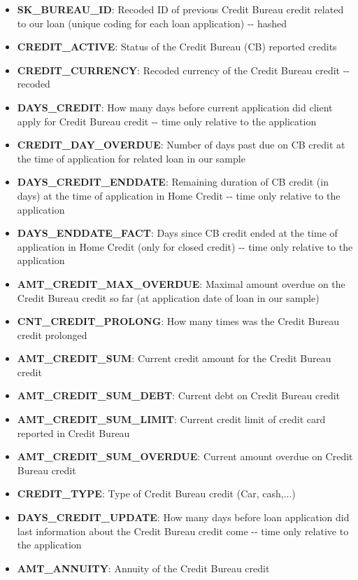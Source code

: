 \documentclass[11pt]{article}
\providecommand{\tightlist}{%
      \setlength{\itemsep}{0pt}\setlength{\parskip}{0pt}}
\begin{document}
\begin{itemize}
\tightlist
\item
  \textbf{SK\_BUREAU\_ID}: Recoded ID of previous Credit Bureau credit
  related to our loan (unique coding for each loan application) -\/-
  hashed
\item
  \textbf{CREDIT\_ACTIVE}: Status of the Credit Bureau (CB) reported
  credits\\
\item
  \textbf{CREDIT\_CURRENCY}: Recoded currency of the Credit Bureau
  credit -\/- recoded
\item
  \textbf{DAYS\_CREDIT}: How many days before current application did
  client apply for Credit Bureau credit -\/- time only relative to the
  application
\item
  \textbf{CREDIT\_DAY\_OVERDUE}: Number of days past due on CB credit at
  the time of application for related loan in our sample\\
\item
  \textbf{DAYS\_CREDIT\_ENDDATE}: Remaining duration of CB credit (in
  days) at the time of application in Home Credit -\/- time only
  relative to the application
\item
  \textbf{DAYS\_ENDDATE\_FACT}: Days since CB credit ended at the time
  of application in Home Credit (only for closed credit) -\/- time only
  relative to the application
\item
  \textbf{AMT\_CREDIT\_MAX\_OVERDUE}: Maximal amount overdue on the
  Credit Bureau credit so far (at application date of loan in our
  sample)
\item
  \textbf{CNT\_CREDIT\_PROLONG}: How many times was the Credit Bureau
  credit prolonged
\item
  \textbf{AMT\_CREDIT\_SUM}: Current credit amount for the Credit Bureau
  credit
\item
  \textbf{AMT\_CREDIT\_SUM\_DEBT}: Current debt on Credit Bureau credit
\item
  \textbf{AMT\_CREDIT\_SUM\_LIMIT}: Current credit limit of credit card
  reported in Credit Bureau\\
\item
  \textbf{AMT\_CREDIT\_SUM\_OVERDUE}: Current amount overdue on Credit
  Bureau credit\\
\item
  \textbf{CREDIT\_TYPE}: Type of Credit Bureau credit (Car, cash,...)
\item
  \textbf{DAYS\_CREDIT\_UPDATE}: How many days before loan application
  did last information about the Credit Bureau credit come -\/- time
  only relative to the application
\item
  \textbf{AMT\_ANNUITY}: Annuity of the Credit Bureau credit
\end{itemize}
\end{document}
